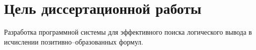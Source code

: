 







\section*{Цель диссертационной работы}
Разработка программной системы для эффективного поиска логического вывода в исчислении позитивно--образованных формул.


